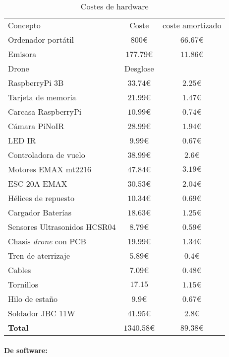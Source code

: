 \begin{table}[H]
	\begin{center}
		\begin{tabular}{l | c | c}\hline
			\toprule
			Concepto & Coste & coste amortizado\\
			\otoprule
			Ordenador portátil & $800 $\euro & $66.67 $\euro\\
			Emisora & $177.79 $\euro & $11.86 $\euro\\
			Drone & Desglose & \\
			RaspberryPi 3B & $33.74 $\euro & $2.25 $\euro\\
			Tarjeta de memoria & $21.99 $\euro & $1.47 $\euro\\
			Carcasa RaspberryPi & $10.99 $\euro & $0.74 $\euro\\
			Cámara PiNoIR & $28.99 $\euro & $1.94 $\euro\\
			LED IR & $9.99 $\euro & $0.67 $\euro\\
			Controladora de vuelo & $38.99 $\euro & $2.6 $\euro\\
			Motores EMAX mt2216 & $47.84 $\euro &$3.19 \euro $\\
			ESC 20A EMAX & $30.53$\euro & $2.04 $\euro\\
			Hélices de repuesto & $10.34 $\euro & $0.69 $\euro\\
			Cargador Baterías & $18.63 $\euro & $1.25$\euro\\
			Sensores Ultrasonidos HCSR04 & $8.79$\euro & $0.59$\euro\\
			Chasis \emph{drone} con PCB & $19.99 $\euro & $1.34 $\euro\\
			Tren de aterrizaje & $5.89 $\euro & $0.4$\euro\\
			Cables & $7.09$\euro & $0.48$\euro\\
			Tornillos & $17.15$ & $1.15$\euro\\
			Hilo de estaño & $9.9$\euro & $0.67$\euro\\
			Soldador JBC 11W & $41.95$\euro & $2.8$\euro\\
			\hline
			\textbf{Total} & $1340.58 $\euro & $89.38$\euro\\
			\bottomrule
		\end{tabular}
		\caption{Costes de hardware}
		\label{tb:costesHardware}
	\end{center}
\end{table}


\paragraph{De software:}

